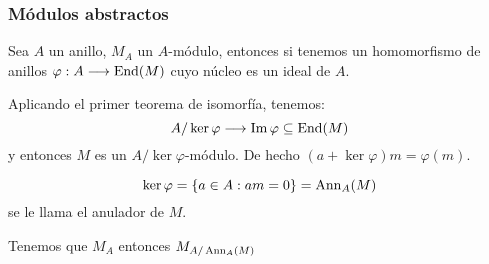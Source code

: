 \subsubsection{Módulos abstractos}

Sea \(A\) un anillo, \(M_A\) un \(A\)-módulo,
entonces si tenemos
un homomorfismo de anillos \(\varphi:A\longrightarrow\operatorname{End}(M)\)
cuyo núcleo es un ideal de \(A\).

Aplicando el primer teorema de isomorfía, tenemos:
\[
  A/\ker\varphi\longrightarrow\Im\varphi\subseteq\operatorname{End}(M)
\]
y entonces \(M\) es un \(A/\ker\varphi\)-módulo.
De hecho \((a+\ker\varphi)m=\varphi(m)\).

\[
  \ker\varphi=\{a\in A: am=0\}=\operatorname{Ann}_A(M)
\]
se le llama el anulador de \(M\).

Tenemos que \(M_A\) entonces \(M_{A/\operatorname{Ann}_A(M)}\)

